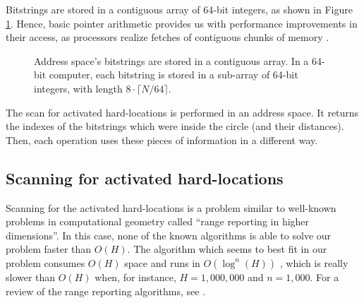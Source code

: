 Bitstrings are stored in a contiguous array of 64-bit integers, as shown in Figure \ref{tab:hl-addresses-detail}. Hence, basic pointer arithmetic provides us with performance improvements in their access, as processors realize fetches of contiguous chunks of memory  \citep{pai2004linux}.

\begin{figure}
\centering
{}

\caption{Address space's bitstrings are stored in a contiguous array. In a 64-bit computer, each bitstring is stored in a sub-array of 64-bit integers, with length $8 \cdot \lceil N/64 \rceil$.\label{tab:hl-addresses-detail}}
\end{figure}

The scan for activated hard-locations is performed in an address space. It returns the indexes of the bitstrings which were inside the circle (and their distances). Then, each operation uses these pieces of information in a different way.

\subsection{Scanning for activated hard-locations}

Scanning for the activated hard-locations is a problem similar to well-known problems in computational geometry called ``range reporting in higher dimensions''. In this case, none of the known algorithms is able to solve our problem faster than $O(H)$. The algorithm which seems to best fit in our problem consumes $O(H)$ space and runs in $O(\log^n(H))$ \citep{chazelle1988functional}, which is really slower than $O(H)$ when, for instance, $H=1,000,000$ and $n=1,000$. For a review of the range reporting algorithms, see \citet{chan2011orthogonal}.

